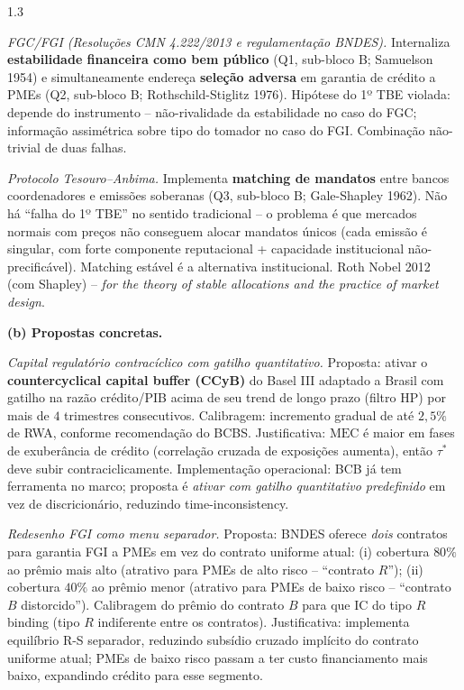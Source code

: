 \documentclass[11pt,addpoints]{exam}
\newcommand{\MEC}{\text{MEC}}
\begin{document}
\begin{spacing}{1.3}
\begin{questions}
\begin{parts}
\begin{solution}
\emph{FGC/FGI (Resoluções CMN 4.222/2013 e regulamentação BNDES).} Internaliza \textbf{estabilidade financeira como bem público} (Q1, sub-bloco B; Samuelson 1954) e simultaneamente endereça \textbf{seleção adversa} em garantia de crédito a PMEs (Q2, sub-bloco B; Rothschild-Stiglitz 1976). Hipótese do 1º TBE violada: depende do instrumento -- não-rivalidade da estabilidade no caso do FGC; informação assimétrica sobre tipo do tomador no caso do FGI. Combinação não-trivial de duas falhas.

\emph{Protocolo Tesouro--Anbima.} Implementa \textbf{matching de mandatos} entre bancos coordenadores e emissões soberanas (Q3, sub-bloco B; Gale-Shapley 1962). Não há ``falha do 1º TBE'' no sentido tradicional -- o problema é que mercados normais com preços não conseguem alocar mandatos únicos (cada emissão é singular, com forte componente reputacional + capacidade institucional não-precificável). Matching estável é a alternativa institucional. Roth Nobel 2012 (com Shapley) -- \emph{for the theory of stable allocations and the practice of market design}.

\textbf{(b) Propostas concretas.}

\emph{Capital regulatório contracíclico com gatilho quantitativo.} Proposta: ativar o \textbf{countercyclical capital buffer (CCyB)} do Basel III adaptado a Brasil com gatilho na razão crédito/PIB acima de seu trend de longo prazo (filtro HP) por mais de $4$ trimestres consecutivos. Calibragem: incremento gradual de até $2{,}5\%$ de RWA, conforme recomendação do BCBS. Justificativa: $\MEC$ é maior em fases de exuberância de crédito (correlação cruzada de exposições aumenta), então $\tau^*$ deve subir contraciclicamente. Implementação operacional: BCB já tem ferramenta no marco; proposta é \emph{ativar com gatilho quantitativo predefinido} em vez de discricionário, reduzindo time-inconsistency.

\emph{Redesenho FGI como menu separador.} Proposta: BNDES oferece \emph{dois} contratos para garantia FGI a PMEs em vez do contrato uniforme atual: (i) cobertura $80\%$ ao prêmio mais alto (atrativo para PMEs de alto risco -- ``contrato $R$''); (ii) cobertura $40\%$ ao prêmio menor (atrativo para PMEs de baixo risco -- ``contrato $B$ distorcido''). Calibragem do prêmio do contrato $B$ para que IC do tipo $R$ binding (tipo $R$ indiferente entre os contratos). Justificativa: implementa equilíbrio R-S separador, reduzindo subsídio cruzado implícito do contrato uniforme atual; PMEs de baixo risco passam a ter custo financiamento mais baixo, expandindo crédito para esse segmento.


\end{solution}
\end{parts}
\end{questions}
\end{spacing}
\end{document}
